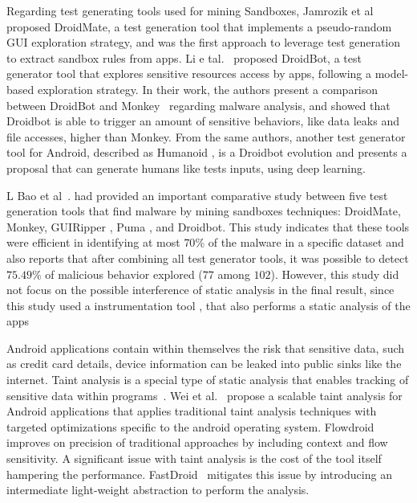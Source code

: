  Regarding test generating tools used for mining Sandboxes, Jamrozik et al \cite{DBLP:conf/icse/JamrozikZ16} proposed DroidMate, a test generation tool that implements a pseudo-random GUI exploration strategy, and was the first approach to leverage test generation to extract sandbox rules from apps. Li e tal.~\cite{DBLP:conf/icse/LiYGC17} proposed DroidBot, a test generator tool that explores sensitive resources access by apps, following a model-based exploration strategy. In their work, the authors present a comparison between DroidBot and Monkey~\cite{Monkey} regarding malware analysis, and showed that Droidbot is able to trigger an amount of sensitive behaviors, like data leaks and file accesses, higher than Monkey. From the same authors, another test generator tool for Android, described as Humanoid \cite{DBLP:conf/kbse/LiY0C19}, is a Droidbot evolution and presents a proposal that can generate humans like tests inputs, using deep learning.




L Bao et al~.\cite{DBLP:conf/wcre/BaoLL18} had provided an important comparative study between five test generation tools that find malware by mining sandboxes techniques: DroidMate, Monkey, GUIRipper \cite{DBLP:conf/kbse/AmalfitanoFTCM12}, Puma \cite{DBLP:conf/mobisys/Hao0NHG14}, and Droidbot. This study indicates that these tools were efficient in identifying at most $70$\% of the malware in a specific dataset and also reports that after combining all test generator tools, it was possible to detect $75.49$\% of malicious behavior explored ($77$ among $102$). However, this study did not focus on the possible interference of static analysis in the final result, since this study used a instrumentation tool \cite{DBLP:conf/icsm/CaiR17a}, that also performs a static analysis of the apps 

Android applications contain within themselves the risk that sensitive data, such as credit card details, device information can be leaked into public sinks like the internet. Taint analysis is a special type of static analysis that enables tracking of sensitive data within programs~\cite{boddenesec}. Wei et al.~\cite{weiissta} propose a scalable taint analysis for Android applications that applies traditional taint analysis techniques with targeted optimizations specific to the android operating system. Flowdroid~\cite{DBLP:conf/pldi/ArztRFBBKTOM14} improves on precision of traditional approaches by including context and flow sensitivity. A significant issue with taint analysis is the cost of the tool itself hampering the performance. FastDroid~\cite{ZHANG2021102161} mitigates this issue by introducing an intermediate light-weight abstraction to perform the analysis. 

